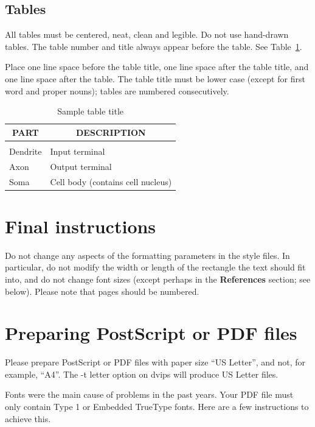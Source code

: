 \documentclass{article} %
\begin{document}
\subsection{Tables}

All tables must be centered, neat, clean and legible. Do not use hand-drawn
tables. The table number and title always appear before the table. See
Table~\ref{sample-table}.

Place one line space before the table title, one line space after the table
title, and one line space after the table. The table title must be lower case
(except for first word and proper nouns); tables are numbered consecutively.

\begin{table}[t]
\caption{Sample table title}
\label{sample-table}
\begin{center}
\begin{tabular}{ll}
\multicolumn{1}{c}{\bf PART}  &\multicolumn{1}{c}{\bf DESCRIPTION}
\\ \hline \\
Dendrite         &Input terminal \\
Axon             &Output terminal \\
Soma             &Cell body (contains cell nucleus) \\
\end{tabular}
\end{center}
\end{table}

\section{Final instructions}
Do not change any aspects of the formatting parameters in the style files.
In particular, do not modify the width or length of the rectangle the text
should fit into, and do not change font sizes (except perhaps in the
\textbf{References} section; see below). Please note that pages should be
numbered.

\section{Preparing PostScript or PDF files}

Please prepare PostScript or PDF files with paper size ``US Letter'', and
not, for example, ``A4''. The -t
letter option on dvips will produce US Letter files.

Fonts were the main cause of problems in the past years. Your PDF file must
only contain Type 1 or Embedded TrueType fonts. Here are a few instructions
to achieve this.
\end{document}
